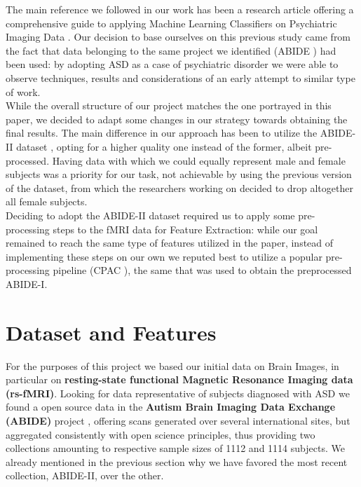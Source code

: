\documentclass{article}
\begin{document}
The main reference we followed in our work has been a research article offering a comprehensive guide to applying Machine Learning Classifiers on Psychiatric Imaging Data \cite{guidelinesml}. Our decision to base ourselves on this previous study came from the fact that data belonging to the same project we identified (ABIDE \cite{abide}) had been used: by adopting ASD as a case of psychiatric disorder we were able to observe techniques, results and considerations of an early attempt to similar type of work.\\

While the overall structure of our project matches the one portrayed in this paper, we decided to adapt some changes in our strategy towards obtaining the final results. The main difference in our approach has been to utilize the ABIDE-II dataset \cite{abide2}, opting for a higher quality one instead of the former, albeit pre-processed. Having data with which we could equally represent male and female subjects was a priority for our task, not achievable by using the previous version of the dataset, from which the researchers working on \cite{guidelinesml} decided to drop altogether all female subjects.\\

Deciding to adopt the ABIDE-II dataset required us to apply some pre-processing steps to the fMRI data for Feature Extraction: while our goal remained to reach the same type of features utilized in the paper, instead of implementing these steps on our own we reputed best to utilize a popular pre-processing pipeline (CPAC \cite{cpac}), the same that was used to obtain the preprocessed ABIDE-I\cite{preprocabide}.




\section{Dataset and Features}

For the purposes of this project we based our initial data on Brain Images, in particular on \textbf{resting-state functional Magnetic Resonance Imaging data (rs-fMRI)}. Looking for data representative of subjects diagnosed with ASD we found a open source data in the \textbf{Autism Brain Imaging Data Exchange (ABIDE)} project \cite{abide}, offering scans generated over several international sites, but aggregated consistently with open science principles, thus providing two collections amounting to respective sample sizes of 1112 and 1114 subjects. We already mentioned in the previous section why we have favored the most recent collection, ABIDE-II, over the other.\\
\end{document}
